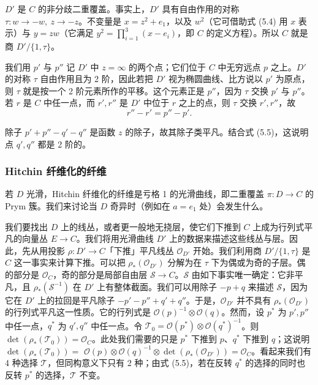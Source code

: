 \documentclass[11pt,a4paper]{article}
\begin{document}

$D'$ 是 $C$ 的非分歧二重覆盖。事实上，$D'$ 具有自由作用的对称 $\tau: w\to -w,\ z\to -z$。不变量是 $x=z^2+e_1$，以及 $w^2$（它可借助式 (5.4) 用 $x$ 表示）与 $y=zw$（它满足 $y^2=\prod_{i=1}^{3}(x-e_i)$，即 $C$ 的定义方程）。所以 $C$ 就是商 $D'/\{1,\tau\}$。

我们用 $p'$ 与 $p''$ 记 $D'$ 中 $z=\infty$ 的两个点；它们位于 $C$ 中无穷远点 $p$ 之上。$D'$ 的对称 $\tau$ 自由作用且为 2 阶，因此若把 $D'$ 视为椭圆曲线、比方说以 $p'$ 为原点，则 $\tau$ 就是按一个 2 阶元素所作的平移。这个元素正是 $p''$，因为 $\tau$ 交换 $p'$ 与 $p''$。若 $r$ 是 $C$ 中任一点，而 $r',r''$ 是 $D'$ 中位于 $r$ 之上的点，则 $\tau$ 交换 $r',r''$，故
\begin{equation}\tag{5.5}
r'' - r' = p'' - p'.
\end{equation}

除子 $p'+p''-q'-q''$ 是函数 $z$ 的除子，故其除子类平凡。结合式 (5.5)，这说明点 $q',q''$ 都是 2 阶的。

\subsubsection{Hitchin 纤维化的纤维}

若 $D$ 光滑，Hitchin 纤维化的纤维是亏格 1 的光滑曲线，即二重覆盖 $\pi: D\to C$ 的 Prym 簇。我们来讨论当 $D$ 奇异时（例如在 $a=e_1$ 处）会发生什么。

我们要找出 $D$ 上的线丛，或者更一般地无挠层，使它们下推到 $C$ 上成为行列式平凡的向量丛 $E\to C$。我们将用光滑曲线 $D'$ 上的数据来描述这些线丛与层。因此，先从用投影 $\rho: D'\to C$「下推」平凡线丛 $\mathcal{O}_{D'}$ 开始。我们利用商 $D'/\{1,\tau\}$ 是 $C$ 这一事实来计算下推。可以把 $\rho_*(\mathcal{O}_{D'})$ 分解为在 $\tau$ 下为偶或为奇的子层。偶的部分是 $\mathcal{O}_C$，奇的部分是局部自由层 $\mathcal{S}\to C$。$\mathcal{S}$ 由如下事实唯一确定：它非平凡，且 $\rho_*(\mathcal{S}^{-1})$ 在 $D'$ 上有整体截面。我们可以用除子 $-p+q$ 来描述 $\mathcal{S}$，因为它在 $D'$ 上的拉回是平凡除子 $-p'-p''+q'+q''$。于是，$\mathcal{O}_{D'}$ 并不具有 $\rho_*(\mathcal{O}_{D'})$ 的行列式平凡这一性质。它的行列式是 $\mathcal{O}(p)^{-1}\otimes\mathcal{O}(q)$。然而，设 $p^*$ 为 $p',p''$ 中任一点，$q^*$ 为 $q',q''$ 中任一点。令 $\mathcal{T}_0 = \mathcal{O}(p^*)\otimes\mathcal{O}(q^*)^{-1}$。则 $\det(\rho_*(\mathcal{T}_0)) = \mathcal{O}_C$。此处我们需要的只是 $p^*$ 下推到 $p$、$q^*$ 下推到 $q$；这说明 $\det(\rho_*(\mathcal{T}_0)) =$
$\mathcal{O}(p)\otimes\mathcal{O}(q)^{-1}\otimes\det(\rho_*(\mathcal{O}_{D'})) = \mathcal{O}_C$。看起来我们有 4 种选择 $\mathcal{T}$，但同构意义下只有 2 种；由式 (5.5)，若在反转 $q^*$ 的选择的同时也反转 $p^*$ 的选择，$\mathcal{T}$ 不变。
\end{document}

